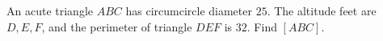 An acute triangle $ABC$ has circumcircle diameter $25$. The altitude feet are $D,E,F$, and the perimeter of triangle $DEF$ is $32$. Find $[ABC]$.
